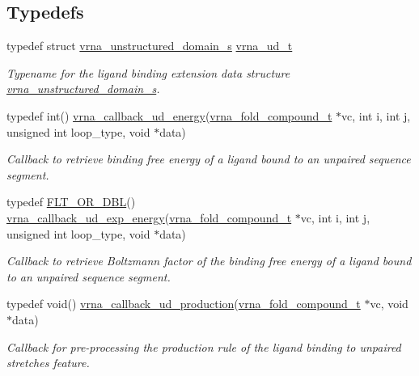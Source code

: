 \subsection*{Typedefs}
\begin{DoxyCompactItemize}
\item 
typedef struct \mbox{\hyperlink{group__domains__up_structvrna__unstructured__domain__s}{vrna\+\_\+unstructured\+\_\+domain\+\_\+s}} \mbox{\hyperlink{group__domains__up_ga0009117b14d29143e8b18ab891f48c2d}{vrna\+\_\+ud\+\_\+t}}
\begin{DoxyCompactList}\small\item\em Typename for the ligand binding extension data structure \mbox{\hyperlink{group__domains__up_structvrna__unstructured__domain__s}{vrna\+\_\+unstructured\+\_\+domain\+\_\+s}}. \end{DoxyCompactList}\item 
typedef int() \mbox{\hyperlink{group__domains__up_ga75825c57d0bfde4ae4f95c044260c5c3}{vrna\+\_\+callback\+\_\+ud\+\_\+energy}}(\mbox{\hyperlink{group__fold__compound_ga1b0cef17fd40466cef5968eaeeff6166}{vrna\+\_\+fold\+\_\+compound\+\_\+t}} $\ast$vc, int i, int j, unsigned int loop\+\_\+type, void $\ast$data)
\begin{DoxyCompactList}\small\item\em Callback to retrieve binding free energy of a ligand bound to an unpaired sequence segment. \end{DoxyCompactList}\item 
typedef \mbox{\hyperlink{group__data__structures_ga31125aeace516926bf7f251f759b6126}{F\+L\+T\+\_\+\+O\+R\+\_\+\+D\+BL}}() \mbox{\hyperlink{group__domains__up_ga861706f257ba993753464b823e65b86e}{vrna\+\_\+callback\+\_\+ud\+\_\+exp\+\_\+energy}}(\mbox{\hyperlink{group__fold__compound_ga1b0cef17fd40466cef5968eaeeff6166}{vrna\+\_\+fold\+\_\+compound\+\_\+t}} $\ast$vc, int i, int j, unsigned int loop\+\_\+type, void $\ast$data)
\begin{DoxyCompactList}\small\item\em Callback to retrieve Boltzmann factor of the binding free energy of a ligand bound to an unpaired sequence segment. \end{DoxyCompactList}\item 
typedef void() \mbox{\hyperlink{group__domains__up_ga4fdfc02c1b660c07f2d887772f02a0a1}{vrna\+\_\+callback\+\_\+ud\+\_\+production}}(\mbox{\hyperlink{group__fold__compound_ga1b0cef17fd40466cef5968eaeeff6166}{vrna\+\_\+fold\+\_\+compound\+\_\+t}} $\ast$vc, void $\ast$data)
\begin{DoxyCompactList}\small\item\em Callback for pre-\/processing the production rule of the ligand binding to unpaired stretches feature. \end{DoxyCompactList}\item 

\end{DoxyCompactItemize}
